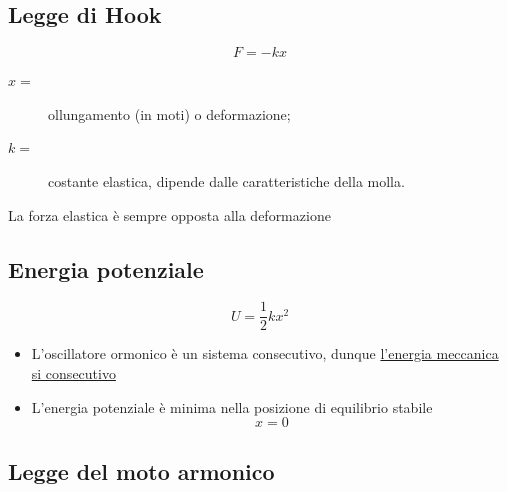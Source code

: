\documentclass{book}
\begin{document}
\subsection{Legge di Hook}
\label{sec:leggedihook}

\begin{equation}
  \label{eq:leggedihook}
  F=-kx
\end{equation}
\begin{description}
\item[$x=$] ollungamento (in moti) o deformazione;
\item[$k=$] costante elastica, dipende dalle caratteristiche della molla.
\end{description}
La forza elastica è sempre opposta alla deformazione

\subsection{Energia potenziale}
\label{sec:enpotenz}
\begin{equation}
  \label{eq:enpotenz}
  U=\frac{1}{2}kx^2
\end{equation}
\begin{itemize}
\item L'oscillatore ormonico è un sistema consecutivo, dunque \underline{l'energia meccanica si consecutivo}
\item L'energia potenziale è minima nella posizione di equilibrio stabile
  \begin{equation}
    \label{eq:enpotenz2}
    x=0
  \end{equation}
\end{itemize}

\subsection{Legge del moto armonico}
\label{sec:leggdelmotarmo}
\end{document}
